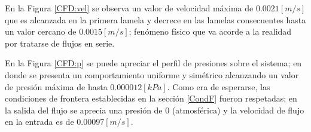 \noindent
\justify

En la Figura \ref{CFD:vel} se observa un valor de velocidad m\'axima de $0.0021 [m/s]$ que es alcanzada en la primera lamela y decrece en las lamelas consecuentes hasta un valor cercano de $0.0015 [m/s]$; fen\'omeno f\'isico que va acorde a la realidad por tratarse de flujos en serie.

\noindent
\justify

En la Figura \ref{CFD:p} se puede apreciar el perfil de presiones sobre el sistema; en donde se presenta un comportamiento uniforme y sim\'etrico alcanzando un valor de presi\'on m\'axima de hasta $0.000012 [kPa]$. Como era de esperarse, las condiciones de frontera establecidas en la secci\'on \ref{CondF} fueron respetadas: en la salida del flujo se aprecia una presi\'on de $0$ (atmosf\'erica) y la velocidad de flujo en la entrada es de $0.00097 [m/s]$.





